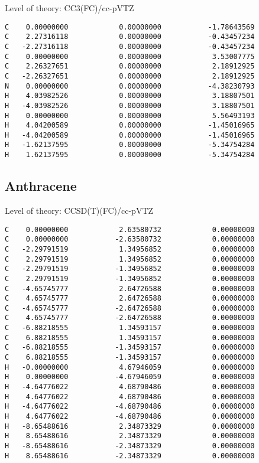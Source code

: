 \documentclass[journal=jctcce,manuscript=article,layout=traditional]{achemso}
\newcommand{\TZ}{cc-pVTZ}
\begin{document}
\begin{singlespace}
Level of theory: CC3(FC)/{\TZ}
\begin{verbatim}
C    0.00000000            0.00000000           -1.78643569
C    2.27316118            0.00000000           -0.43457234
C   -2.27316118            0.00000000           -0.43457234
C    0.00000000            0.00000000            3.53007775
C    2.26327651            0.00000000            2.18912925
C   -2.26327651            0.00000000            2.18912925
N    0.00000000            0.00000000           -4.38230793
H    4.03982526            0.00000000            3.18807501
H   -4.03982526            0.00000000            3.18807501
H    0.00000000            0.00000000            5.56493193
H    4.04200589            0.00000000           -1.45016965
H   -4.04200589            0.00000000           -1.45016965
H   -1.62137595            0.00000000           -5.34754284
H    1.62137595            0.00000000           -5.34754284
\end{verbatim}
\end{singlespace}

\subsection*{Anthracene}

\begin{singlespace}
Level of theory: CCSD(T)(FC)/{\TZ}
\begin{verbatim}
C    0.00000000            2.63580732            0.00000000
C    0.00000000           -2.63580732            0.00000000
C   -2.29791519            1.34956852            0.00000000
C    2.29791519            1.34956852            0.00000000
C   -2.29791519           -1.34956852            0.00000000
C    2.29791519           -1.34956852            0.00000000
C   -4.65745777            2.64726588            0.00000000
C    4.65745777            2.64726588            0.00000000
C   -4.65745777           -2.64726588            0.00000000
C    4.65745777           -2.64726588            0.00000000
C   -6.88218555            1.34593157            0.00000000
C    6.88218555            1.34593157            0.00000000
C   -6.88218555           -1.34593157            0.00000000
C    6.88218555           -1.34593157            0.00000000
H   -0.00000000            4.67946059            0.00000000
H    0.00000000           -4.67946059            0.00000000
H   -4.64776022            4.68790486            0.00000000
H    4.64776022            4.68790486            0.00000000
H   -4.64776022           -4.68790486            0.00000000
H    4.64776022           -4.68790486            0.00000000
H   -8.65488616            2.34873329            0.00000000
H    8.65488616            2.34873329            0.00000000
H   -8.65488616           -2.34873329            0.00000000
H    8.65488616           -2.34873329            0.00000000
\end{verbatim}
\end{singlespace}
\end{document}
